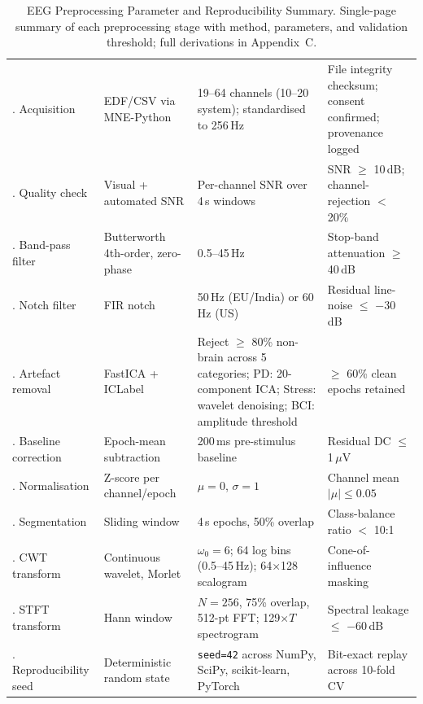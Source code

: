 {\tablestripes\tablefontsize
\begin{xltabular}{\textwidth}{@{} >{\raggedright\arraybackslash}p{2.8cm} >{\raggedright\arraybackslash}p{2.8cm} L >{\raggedright\arraybackslash}p{3.0cm} @{}}
\caption[EEG Preprocessing Parameter and Reproducibility Summary]{EEG Preprocessing Parameter and Reproducibility Summary. Single-page summary of each preprocessing stage with method, parameters, and validation threshold; full derivations in Appendix~C.}\label{tab:preproc_param_summary} \\
\toprule
{} &  &  &  \\
\midrule
\endfirsthead
\endhead
\bottomrule
{}. Acquisition & EDF/CSV via MNE-Python & 19--64 channels (10--20 system); standardised to 256\,Hz & File integrity checksum; consent confirmed; provenance logged \\
. Quality check & Visual + automated SNR & Per-channel SNR over 4\,s windows & SNR $\geq$ 10\,dB; channel-rejection $<$ 20\% \\
. Band-pass filter & Butterworth 4th-order, zero-phase & 0.5--45\,Hz & Stop-band attenuation $\geq$ 40\,dB \\
. Notch filter & FIR notch & 50\,Hz (EU/India) or 60\,Hz (US) & Residual line-noise $\leq$ $-$30\,dB \\
. Artefact removal & FastICA + ICLabel & Reject $\geq$ 80\% non-brain across 5 categories; PD: 20-component ICA; Stress: wavelet denoising; BCI: amplitude threshold & $\geq$ 60\% clean epochs retained \\
. Baseline correction & Epoch-mean subtraction & 200\,ms pre-stimulus baseline & Residual DC $\leq$ 1\,$\mu$V \\
. Normalisation & Z-score per channel/epoch & $\mu = 0$, $\sigma = 1$ & Channel mean $|\mu| \leq 0.05$ \\
. Segmentation & Sliding window & 4\,s epochs, 50\% overlap & Class-balance ratio $<$ 10:1 \\
. CWT transform & Continuous wavelet, Morlet & $\omega_0 = 6$; 64 log bins (0.5--45\,Hz); 64$\times$128 scalogram & Cone-of-influence masking \\
. STFT transform & Hann window & $N = 256$, 75\% overlap, 512-pt FFT; 129$\times T$ spectrogram & Spectral leakage $\leq$ $-$60\,dB \\
. Reproducibility seed & Deterministic random state & \texttt{seed=42} across NumPy, SciPy, scikit-learn, PyTorch & Bit-exact replay across 10-fold CV \\
\end{xltabular}}


